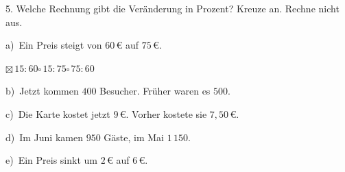 \documentclass[11pt]{article}
\newcommand{\grau}[1]{{\color{mbgrau}#1}}
\begin{document}
\begin{pfaufg}{}{5.}{}
Welche Rechnung gibt die Veränderung in Prozent? Kreuze an. Rechne nicht aus.\par\medskip
\grau{a)\ Ein Preis steigt von $60\,€$ auf $75\,€$.\par\hspace*{1.2em}$\boxtimes$\,$15 : 60$\hspace{0.9em}$\square$\,$15 : 75$\hspace{0.9em}$\square$\,$75 : 60$}\par\medskip
b)\ Jetzt kommen $400$ Besucher. Früher waren es $500$.\par\hspace*{1.2em}\par\medskip
c)\ Die Karte kostet jetzt $9\,€$. Vorher kostete sie $7{,}50\,€$.\par\hspace*{1.2em}\par\medskip
d)\ Im Juni kamen $950$ Gäste, im Mai $1\,150$.\par\hspace*{1.2em}\par\medskip
e)\ Ein Preis sinkt um $2\,€$ auf $6\,€$.\par\hspace*{1.2em}\par
{}
\end{pfaufg}
\end{document}
